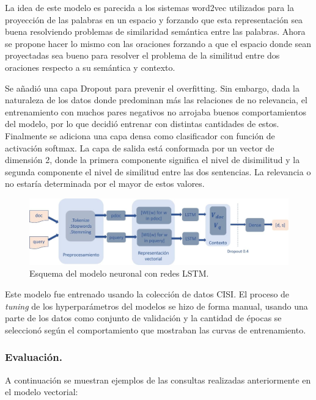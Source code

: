 \documentclass{llncs}
\begin{document}
La idea de este modelo es parecida a los sistemas word2vec utilizados para la proyección de las palabras en un espacio y forzando que esta representación sea buena resolviendo problemas de similaridad semántica entre las palabras. Ahora se propone hacer lo mismo con las oraciones forzando a que el espacio donde sean proyectadas sea bueno para resolver el problema de la similitud entre dos oraciones respecto a su semántica y contexto. 

Se añadió una capa Dropout para prevenir el overfitting. Sin embargo, dada la naturaleza de los datos donde predominan más las relaciones de no relevancia, el entrenamiento con muchos pares negativos no arrojaba buenos comportamientos del modelo, por lo que decidió entrenar con distintas cantidades de estos. Finalmente se adiciona una capa densa como clasificador con función de activación softmax. La capa de salida está conformada por un vector de dimensión 2, donde la primera componente significa el nivel de disimilitud y la segunda componente el nivel de similitud entre las dos sentencias. La relevancia o no estaría determinada por el mayor de estos valores.

\begin{figure}
	\begin{center}
		\includegraphics[width=\linewidth]{ ./images/lstm.jpg}
		\caption{Esquema del modelo neuronal con redes LSTM.}
		\label{lstm}
	\end{center}
\end{figure}

Este modelo fue entrenado usando la colección de datos CISI. El proceso de \textit{tuning} de los hyperparámetros del modelos se hizo de forma manual, usando una parte de los datos como conjunto de validación y la cantidad de épocas se seleccionó según el comportamiento que mostraban las curvas de entrenamiento.




\subsubsection{Evaluación.}

A continuación se muestran ejemplos de las consultas realizadas anteriormente en el modelo vectorial: 
\end{document}
